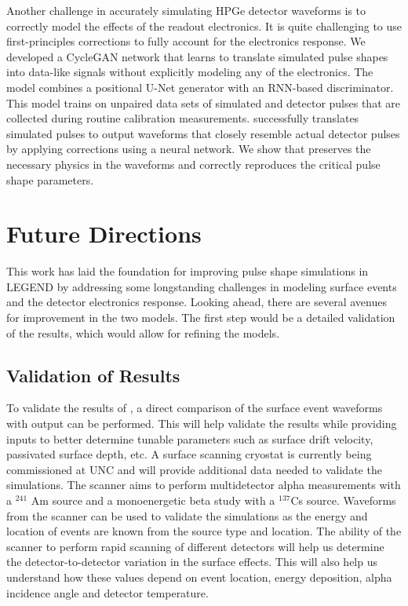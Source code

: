 Another challenge in accurately simulating HPGe detector waveforms is to correctly model the effects of the readout electronics. It is quite challenging to use first-principles corrections to fully account for the electronics response. We developed a CycleGAN network that learns to translate simulated pulse shapes into data-like signals without explicitly modeling any of the electronics. The model combines a positional U-Net generator with an RNN-based discriminator. This model trains on unpaired data sets of simulated and detector pulses that are collected during routine calibration measurements. {\cpunet} successfully translates simulated pulses to output waveforms that closely resemble actual detector pulses by applying corrections using a neural network.  We show that {\cpunet} preserves the necessary physics in the waveforms and correctly reproduces the critical pulse shape parameters.

\section{Future Directions}
This work has laid the foundation for improving pulse shape simulations in LEGEND by addressing some longstanding challenges in modeling surface events and the detector electronics response. Looking ahead, there are several avenues for improvement in the two models. The first step would be a detailed validation of the results, which would allow for refining the models.

\subsection{Validation of Results}
To validate the results of {\ehd}, a direct comparison of the surface event waveforms with {\ehd} output can be performed. This will help validate the results while providing inputs to better determine tunable parameters such as surface drift velocity, passivated surface depth, etc. A surface scanning cryostat is currently being commissioned at UNC and will provide additional data needed to validate the simulations. The scanner aims to perform multidetector alpha measurements with a $^{241}$ Am source and a monoenergetic beta study with a $^{137}$Cs source. Waveforms from the scanner can be used to validate the simulations as the energy and location of events are known from the source type and location. The ability of the scanner to perform rapid scanning of different detectors will help us determine the detector-to-detector variation in the surface effects. This will also help us understand how these values depend on event location, energy deposition, alpha incidence angle and detector temperature.

